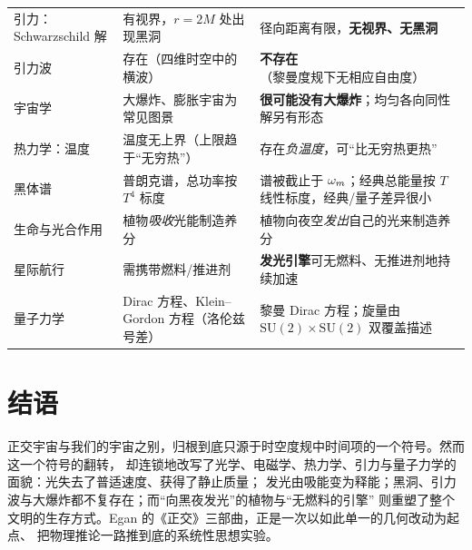 \begin{longtable}{p{2.9cm} p{5.7cm} p{5.9cm}}
引力：Schwarzschild 解 &
有视界，$r=2M$ 处出现黑洞 &
径向距离有限，\textbf{无视界、无黑洞} \\

引力波 &
存在（四维时空中的横波） &
\textbf{不存在}（黎曼度规下无相应自由度） \\

宇宙学 &
大爆炸、膨胀宇宙为常见图景 &
\textbf{很可能没有大爆炸}；均匀各向同性解另有形态 \\

热力学：温度 &
温度无上界（上限趋于“无穷热”） &
存在\emph{负温度}，可“比无穷热更热” \\

黑体谱 &
普朗克谱，总功率按 $T^{4}$ 标度 &
谱被截止于 $\omega_m$；经典总能量按 $T$ 线性标度，经典/量子差异很小 \\

生命与光合作用 &
植物\emph{吸收}光能制造养分 &
植物向夜空\emph{发出}自己的光来制造养分 \\

星际航行 &
需携带燃料/推进剂 &
\textbf{发光引擎}可无燃料、无推进剂地持续加速 \\

量子力学 &
Dirac 方程、Klein--Gordon 方程（洛伦兹号差） &
黎曼 Dirac 方程；旋量由 $\mathrm{SU}(2)\times\mathrm{SU}(2)$ 双覆盖描述 \\

\end{longtable}

\section*{结语}

正交宇宙与我们的宇宙之别，归根到底只源于时空度规中时间项的一个符号。然而这一个符号的翻转，
却连锁地改写了光学、电磁学、热力学、引力与量子力学的面貌：光失去了普适速度、获得了静止质量；
发光由吸能变为释能；黑洞、引力波与大爆炸都不复存在；而“向黑夜发光”的植物与“无燃料的引擎”
则重塑了整个文明的生存方式。Egan 的《正交》三部曲，正是一次以如此单一的几何改动为起点、
把物理推论一路推到底的系统性思想实验。
